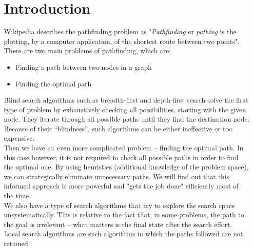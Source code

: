 \documentclass[a4paper]{article}
\begin{document}
\section{Introduction}

Wikipedia describes the pathfinding problem as "\emph{Pathfinding} or \emph{pathing} is the plotting, by a computer application, of the shortest route between two points". There are two main problems of pathfinding, which are:

\begin{itemize}
	\item Finding a path between two nodes in a graph 
	\item Finding the optimal path
\end{itemize}

Blind search algorithms such as breadth-first and depth-first search solve the first type of problem by exhaustively checking all possibilities, starting with the given node. They iterate through all possible paths until they find the destination node. Because of their “blindness”, such algorithms can be either ineffective or too expensive. \\

Then we have an even more complicated problem – finding the optimal path. In this case however, it is not required to check all possible paths in order to find the optimal one. By using heuristics (additional knowledge of the problem space), we can strategically eliminate unnecessary paths. We will find out that this informed approach is more powerful and "gets the job done" efficiently most of the time. \\

We also have a type of search algorithms that try to explore the search space unsystematically. This is relative to the fact that, in some problems, the path to the goal is irrelevant – what matters is the final state after the search effort. Local search algorithms are such algorithms in which the paths followed are not retained. \\
 
\end{document}

